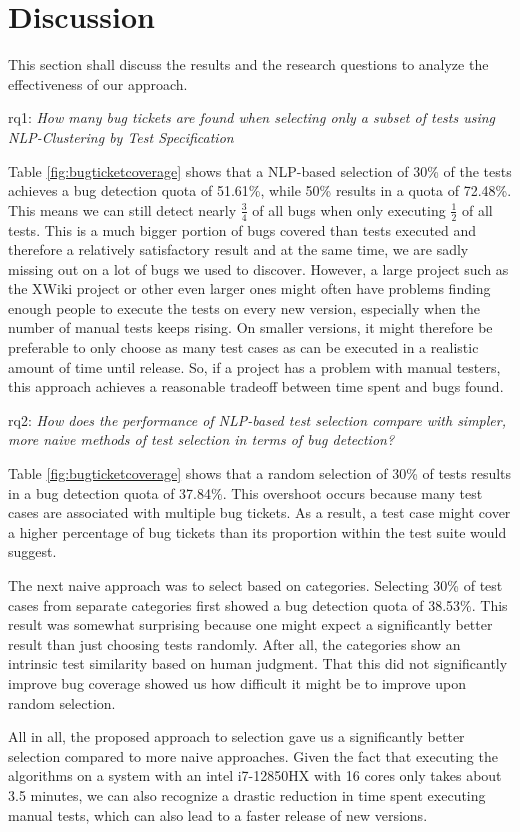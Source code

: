 \section{Discussion}

This section shall discuss the results and the research questions to analyze the effectiveness of our approach.

\ac{rq}1: \emph{How many bug tickets are found when selecting only a subset of tests using NLP-Clustering by Test Specification}

Table \ref{fig:bugticketcoverage} shows that a \ac{NLP}-based selection of 30\% of the tests achieves a bug detection quota of 51.61\%, while 50\% results in a quota of 72.48\%.
This means we can still detect nearly $\frac{3}{4}$ of all bugs when only executing $\frac{1}{2}$ of all tests.
This is a much bigger portion of bugs covered than tests executed and therefore a relatively satisfactory result and at the same time, we are sadly missing out on a lot of bugs we used to discover.
However, a large project such as the XWiki project or other even larger ones might often have problems finding enough people to execute the tests on every new version, especially when the number of manual tests keeps rising. On smaller versions, it might therefore be preferable to only choose as many test cases as can be executed in a realistic amount of time until release.
So, if a project has a problem with manual testers, this approach achieves a reasonable tradeoff between time spent and bugs found.

\ac{rq}2: \emph{How does the performance of NLP-based test selection compare with simpler, more naive methods of test selection in terms of bug detection?}

Table \ref{fig:bugticketcoverage} shows that a random selection of 30\% of tests results in a bug detection quota of 37.84\%. This overshoot occurs because many test cases are associated with multiple bug tickets. As a result, a test case might cover a higher percentage of bug tickets than its proportion within the test suite would suggest.

The next naive approach was to select based on categories. Selecting 30\% of test cases from separate categories first showed a bug detection quota of 38.53\%. This result was somewhat surprising because one might expect a significantly better result than just choosing tests randomly. After all, the categories show an intrinsic test similarity based on human judgment. That this did not significantly improve bug coverage showed us how difficult it might be to improve upon random selection.

All in all, the proposed approach to selection gave us a significantly better selection compared to more naive approaches. Given the fact that executing the algorithms on a system with an intel i7-12850HX with 16 cores only takes about 3.5 minutes, we can also recognize a drastic reduction in time spent executing manual tests, which can also lead to a faster release of new versions.

